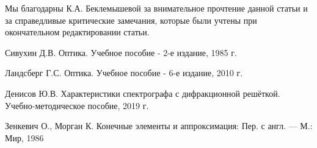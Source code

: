 \documentclass[
11pt,%
tightenlines,%
twoside,%
onecolumn,%
nofloats,%
nobibnotes,%
nofootinbib,%
superscriptaddress,%
noshowpacs,%
centertags]%
{revtex4}
\begin{document}
\begin{acknowledgments}
    Мы благодарны К.А. Беклемышевой за внимательное прочтение данной статьи и за справедливые критические
    замечания, которые были учтены при окончательном редактировании статьи.
\end{acknowledgments}


\begin{thebibliography}{99}
    Сивухин Д.В. Оптика. Учебное пособие - 2-е издание, 1985 г.

    Ландсберг Г.С. Оптика. Учебное пособие - 6-е издание, 2010 г.

    Денисов Ю.В. Характеристики спектрографа с дифракционной решёткой. Учебно-методическое пособие, 2019 г.
    
    Зенкевич О., Морган К. Конечные элементы и аппроксимация: Пер. с англ. — М.: Мир, 1986    
\end{thebibliography}
\end{document}
